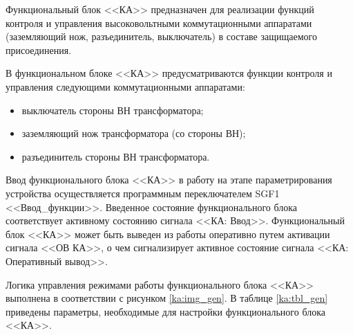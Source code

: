 \begin{flushleft}
\color{black}
\nopagebreak
\vspace{3mm}
\end{flushleft}


\begin{flushleft}
\color{black}
\nopagebreak
\end{flushleft}

\par
Функциональный блок <<КА>> предназначен для реализации функций контроля и управления высоковольтными коммутационными аппаратами (заземляющий нож, разъединитель, выключатель) в составе защищаемого присоединения.  

\par
В функциональном блоке <<КА>> предусматриваются функции контроля и управления следующими коммутационными аппаратами:
\begin{itemize}
\item выключатель стороны ВН трансформатора;
\item заземляющий нож трансформатора (со стороны ВН);
\item разъединитель стороны ВН трансформатора.
\end{itemize}

\par
Ввод функционального блока <<КА>> в работу на этапе параметрирования устройства осуществляется программным переключателем SGF1 <<Ввод\_функции>>. Введенное состояние функционального блока соответствует активному состоянию сигнала <<КА: Ввод>>. Функциональный блок <<КА>> может быть выведен из работы оперативно путем активации сигнала <<ОВ КА>>, о чем сигнализирует активное состояние сигнала <<КА: Оперативный вывод>>.

Логика управления режимами работы функционального блока <<КА>> выполнена в соответствии с рисунком \ref{ka:img_gen}. В таблице \ref{ka:tbl_gen} приведены параметры, необходимые для настройки функционального блока <<КА>>. 

